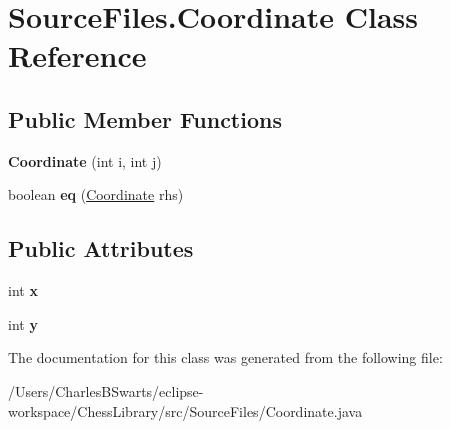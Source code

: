\hypertarget{class_source_files_1_1_coordinate}{}\section{Source\+Files.\+Coordinate Class Reference}
\label{class_source_files_1_1_coordinate}
\subsection*{Public Member Functions}
\begin{DoxyCompactItemize}
\item 
\mbox{\label{class_source_files_1_1_coordinate_a42b6f0ed107bc33c60a95ca201ba674e}} 
{\bfseries Coordinate} (int i, int j)
\item 
\mbox{\label{class_source_files_1_1_coordinate_aacd0c92f36535ff141a72ecb512c6ed7}} 
boolean {\bfseries eq} (\mbox{\hyperlink{class_source_files_1_1_coordinate}{Coordinate}} rhs)
\end{DoxyCompactItemize}
\subsection*{Public Attributes}
\begin{DoxyCompactItemize}
\item 
\mbox{\label{class_source_files_1_1_coordinate_a439fe353b30f0dae43e6a26bcadd3381}} 
int {\bfseries x}
\item 
\mbox{\label{class_source_files_1_1_coordinate_a6ca661936240ac9143c61e8a8f6214ec}} 
int {\bfseries y}
\end{DoxyCompactItemize}


The documentation for this class was generated from the following file\+:\begin{DoxyCompactItemize}
\item 
/\+Users/\+Charles\+B\+Swarts/eclipse-\/workspace/\+Chess\+Library/src/\+Source\+Files/Coordinate.\+java\end{DoxyCompactItemize}
